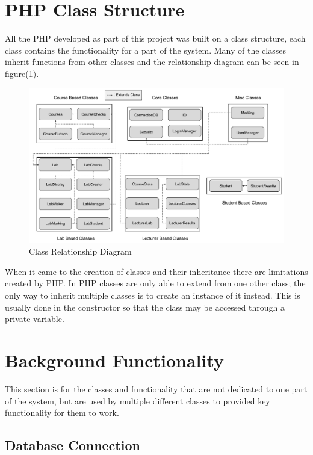 \documentclass[11pt]{report}
\begin{document}
\newpage
\section{PHP Class Structure}

All the PHP developed as part of this project was built on a class structure, each class contains the functionality for a part of the system. Many of the classes inherit functions from other classes and the relationship diagram can be seen in figure(\ref{fig:implement-relationship}).

\begin{figure}[H]
    \centering
    \includegraphics[width=1\textwidth]{images/implementation/Class-Structure.png}
    \caption{Class Relationship Diagram}
    \label{fig:implement-relationship}
\end{figure}

When it came to the creation of classes and their inheritance there are limitations created by PHP. In PHP classes are only able to extend from one other class; the only way to inherit multiple classes is to create an instance of it instead. This is usually done in the constructor so that the class may be accessed through a private variable.




\section{Background Functionality}

This section is for the classes and functionality that are not dedicated to one part of the system, but are used by multiple different classes to provided key functionality for them to work.  

\subsection{Database Connection}
\end{document}
